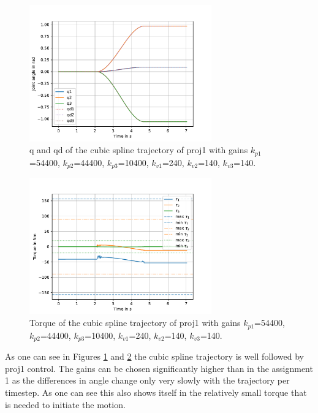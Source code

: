 \begin{figure} [H]
   \begin{center}
        \includegraphics[width=0.7\textwidth]{SRC/Puma_spline_q_qd.pdf}
   \end{center}
  \caption{q and qd of the cubic spline trajectory of proj1 with gains $k_{p1}$=54400, $k_{p2}$=44400, $k_{p3}$=10400, $k_{v1}$=240, $k_{v2}$=140, $k_{v3}$=140.}
  \label{fig:PumaCubicSplineQ}
\end{figure}


\begin{figure} [H]
   \begin{center}
        \includegraphics[width=0.7\textwidth]{SRC/Puma_spline_tau.pdf}
   \end{center}
  \caption{Torque of the cubic spline trajectory of proj1 with gains $k_{p1}$=54400, $k_{p2}$=44400, $k_{p3}$=10400, $k_{v1}$=240, $k_{v2}$=140, $k_{v3}$=140.}
  \label{fig:PumaCubicSplineTau}
\end{figure}

As one can see in Figures \ref{fig:PumaCubicSplineQ} and \ref{fig:PumaCubicSplineTau} the cubic spline trajectory is well followed by proj1 control. The gains can be chosen significantly higher than in the assignment 1 as the differences in angle change only very slowly with the trajectory per timestep. As one can see this also shows itself in the relatively small torque that is needed to initiate the motion. 
\newline


